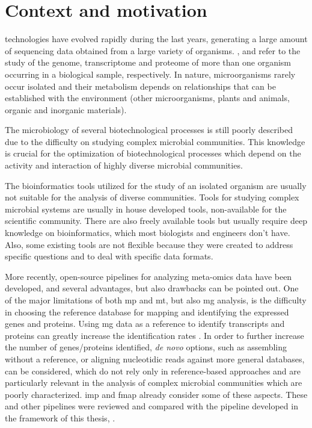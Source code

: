 \documentclass[
  oneside,
  11pt, a4paper,
  footinclude=true,
  headinclude=true,
  cleardoublepage=empty
]{scrbook}
\begin{document}
	\section{Context and motivation}
    
     technologies have evolved rapidly during the last years, generating a large amount of sequencing data obtained from a large variety of organisms. ,  and  refer to the study of the genome, transcriptome and proteome of more than one organism occurring in a biological sample, respectively. In nature, microorganisms rarely occur isolated and their metabolism depends on relationships that can be established with the environment (other microorganisms, plants and animals, organic and inorganic materials). 
    
    The microbiology of several biotechnological processes is still poorly described due to the difficulty on studying complex microbial communities. This knowledge is crucial for the optimization of biotechnological processes which depend on the activity and interaction of highly diverse microbial communities.
    
    The bioinformatics tools utilized for the study of an isolated organism are usually not suitable for the analysis of diverse communities. Tools for studying complex microbial systems are usually in house developed tools, non-available for the scientific community. There are also freely available tools but usually require deep knowledge on bioinformatics, which most biologists and engineers don't have. Also, some existing tools are not flexible because they were created to address specific questions and to deal with specific data formats.
    
    More recently, open-source pipelines for analyzing meta-omics data have been developed, and several advantages, but also drawbacks can be pointed out. One of the major limitations of both \gls{mp} and \gls{mt}, but also \gls{mg} analysis, is the difficulty in choosing the reference database for mapping and identifying the expressed genes and proteins. Using \gls{mg} data as a reference to identify transcripts and proteins can greatly increase the identification rates \citep{heyer2017challenges}. In order to further increase the number of genes/proteins identified, \textit{de novo} options, such as assembling without a reference, or aligning nucleotidic reads against more general databases, can be considered, which do not rely only in reference-based approaches and are particularly relevant in the analysis of complex microbial communities which are poorly characterized. \gls{imp} \citep{Narayanasamy2016} and \gls{fmap} \citep{Kim2016} already consider some of these aspects. These and other pipelines were reviewed and compared with the pipeline developed in the framework of this thesis, .
    
\end{document}
